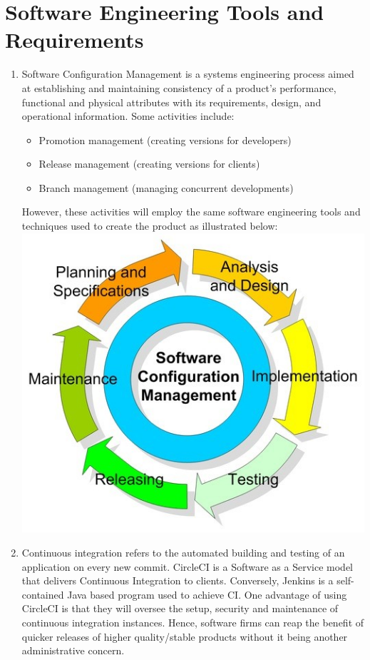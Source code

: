 \documentclass{article}
\begin{document}
\section{Software Engineering Tools and Requirements}
\begin{enumerate}
    \item Software Configuration Management is a systems engineering process aimed at establishing and maintaining consistency of a product’s performance, functional and physical attributes with its requirements, design, and operational information. Some activities include:
    \begin{itemize}
        \item Promotion management (creating versions for developers)
        \item Release management (creating versions for clients)
        \item Branch management (managing concurrent developments)
    \end{itemize}

    However, these activities will employ the same software engineering tools and techniques used to create the product as illustrated below:\newline
    \includegraphics{images/cycle.jpg}
    \item Continuous integration refers to the automated building and testing of an application on every new commit. CircleCI is a Software as a Service model that delivers Continuous Integration to clients. Conversely, Jenkins is a self-contained Java based program used to achieve CI. One advantage of using CircleCI is that they will oversee the setup, security and maintenance of continuous integration instances. Hence, software firms can reap the benefit of quicker releases of higher quality/stable products without it being another administrative concern. 


\end{enumerate}
\end{document}
